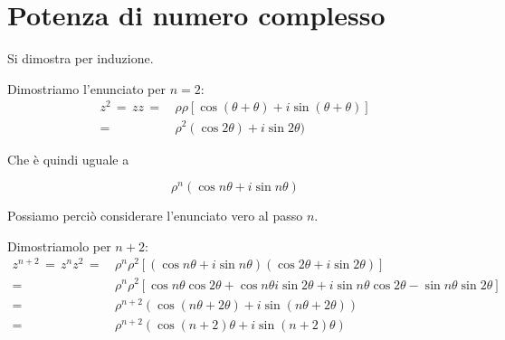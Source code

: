 \documentclass[../../dimostrazioni]{subfiles}
\begin{document}
        \section*{Potenza di numero complesso}

            Si dimostra per induzione.
            
            \medskip

            Dimostriamo l'enunciato per \(n = 2\):
            \begin{align}
                z^2 \, = \, zz \, =& \, \rho\rho [\cos(\theta + \theta) + i\sin(\theta+\theta)] \\
                                  =& \, \rho^2(\cos2\theta)+ i\sin2\theta)
            \end{align}

            Che è quindi uguale a

            \[\rho^n (\cos n\theta +i\sin n\theta)\]

            Possiamo perciò considerare l'enunciato vero al passo \(n\).

            \medskip

            Dimostriamolo per \(n + 2\):
            \begin{align}
                z^{n+2} \, = \, z^n z^2 \, =& \, \rho^n \rho^2 [(\cos n\theta + i\sin n\theta)(\cos 2\theta + i\sin 2\theta)] \\
                                           =& \, \rho^n \rho^2 [\cos n\theta\cos2\theta + \cos n\theta i\sin2\theta + i\sin n\theta \cos2\theta - \sin n\theta \sin2\theta] \\
                                           =& \, \rho^{n+2} (\cos(n\theta + 2\theta) + i\sin(n\theta + 2\theta)) \\
                                           =& \, \rho^{n+2} (\cos(n+2)\theta + i\sin(n+2)\theta)
            \end{align}
            
\end{document}
